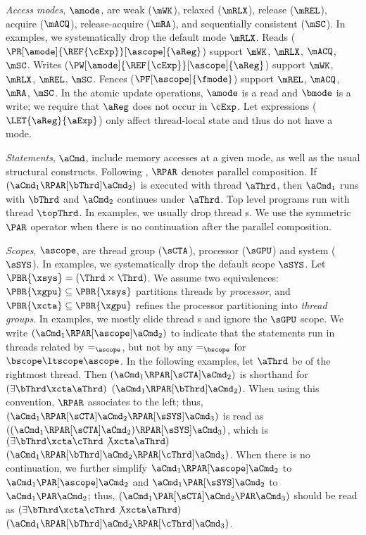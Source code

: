 \emph{Access modes}, $\amode$, are {weak} ($\mWK$), {relaxed} ($\mRLX$),
{release} ($\mREL$), {acquire} ($\mACQ$), {release-acquire} ($\mRA$), and
{sequentially consistent} ($\mSC$).
% 
In examples, we systematically drop the default mode $\mRLX$.
%
% 
Reads ($\PR[\amode]{\REF{\cExp}}[\ascope]{\aReg}$) support
$\mWK$,
$\mRLX$,
$\mACQ$,
$\mSC$. 
Writes ($\PW[\amode]{\REF{\cExp}}[\ascope]{\aReg}$) support
$\mWK$,
$\mRLX$,
$\mREL$,
$\mSC$. 
Fences ($\PF[\ascope]{\fmode}$) support
$\mREL$,
$\mACQ$,
$\mRA$, 
$\mSC$.
% 
In the atomic update operations, $\amode$ is a read and $\bmode$ is a write;
we require that $\aReg$ does not occur in $\cExp$.
%
Let expressions ($\LET{\aReg}{\aExp}$) only affect thread-local state and
thus do not have a mode.

\emph{Statements}, $\aCmd$, include memory accesses at a
given mode, as well as the usual structural constructs.  Following
\cite{DBLP:conf/icfp/FerreiraHJ96}, $\RPAR$ denotes parallel composition.  If
$(\aCmd_1 \RPAR[\bThrd] \aCmd_2)$ is executed with thread \ID{} $\aThrd$, then
$\aCmd_1$ runs with \ID{} $\bThrd$ and $\aCmd_2$ continues under \ID{} $\aThrd$.
Top level programs run with thread \ID{} $\topThrd$.  In examples, we usually
drop thread \ID{}s.  We use the symmetric $\PAR$ operator when there is no
continuation after the parallel composition.

\emph{Scopes}, $\ascope$, are thread group ($\sCTA$), processor ($\sGPU$) and
system ($\sSYS$).
%
In examples, we systematically drop the default scope $\sSYS$.
% 
Let $\PBR{\xsys}=(\Thrd\times\Thrd)$.  We assume two equivalences:
$\PBR{\xgpu}\subseteq\PBR{\xsys}$ partitions threads by \emph{processor}, and
$\PBR{\xcta}\subseteq\PBR{\xgpu}$ refines the processor partitioning into
\emph{thread groups}.
%
In examples, we mostly elide thread \ID{}s and ignore the $\sGPU$ scope.  We
write $(\aCmd_1\RPAR[\ascope]\aCmd_2)$ to indicate that the statements run in
threads related by $=_\ascope$, but not by any $=_\bscope$ for
$\bscope\ltscope\ascope$.  In the following examples, let $\aThrd$ be \ID{}
of the rightmost thread.  Then $(\aCmd_1\RPAR[\sCTA]\aCmd_2)$ is shorthand
for $(\exists\bThrd\xcta\aThrd)$ $(\aCmd_1\RPAR[\bThrd]\aCmd_2)$.  When using
this convention, $\RPAR$ associates to the left; thus,
$(\aCmd_1\RPAR[\sCTA]\aCmd_2\RPAR[\sSYS]\aCmd_3)$ is read as
$((\aCmd_1\RPAR[\sCTA]\aCmd_2)\RPAR[\sSYS]\aCmd_3)$, which is
$(\exists\bThrd\xcta\cThrd\not\xcta\aThrd)$
$(\aCmd_1\RPAR[\bThrd]\aCmd_2\RPAR[\cThrd]\aCmd_3)$.  When there is no
continuation, we further simplify $\aCmd_1\RPAR[\ascope]\aCmd_2$ to
$\aCmd_1\PAR[\ascope]\aCmd_2$ and $\aCmd_1\PAR[\sSYS]\aCmd_2$ to
$\aCmd_1\PAR\aCmd_2$; thus, $(\aCmd_1\PAR[\sCTA]\aCmd_2\PAR\aCmd_3)$ should
be read as $(\exists\bThrd\xcta\cThrd\not\xcta\aThrd)$
$(\aCmd_1\RPAR[\bThrd]\aCmd_2\RPAR[\cThrd]\aCmd_3)$.

